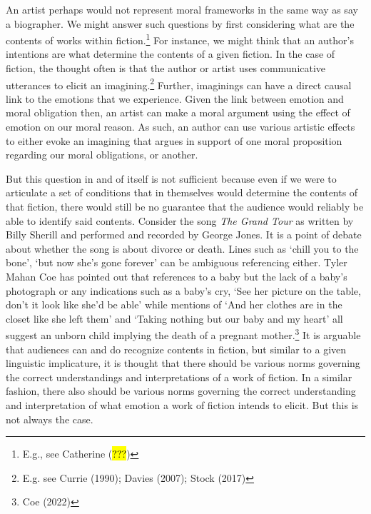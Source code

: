 \documentclass[
  letterpaper,
  DIV=11,
  numbers=noendperiod]{scrartcl}
\theoremstyle{remark}
\begin{document}
An artist perhaps would not represent moral frameworks in the same way
as say a biographer. We might answer such questions by first considering
what are the contents of works within fiction.\footnote{E.g., see
  Catherine (\hl{???})} For instance, we might think that an author's
intentions are what determine the contents of a given fiction. In the
case of fiction, the thought often is that the author or artist uses
communicative utterances to elicit an imagining.\footnote{E.g. see
  Currie (1990); Davies (2007); Stock (2017)} Further, imaginings can
have a direct causal link to the emotions that we experience. Given the
link between emotion and moral obligation then, an artist can make a
moral argument using the effect of emotion on our moral reason. As such,
an author can use various artistic effects to either evoke an imagining
that argues in support of one moral proposition regarding our moral
obligations, or another.

But this question in and of itself is not sufficient because even if we
were to articulate a set of conditions that in themselves would
determine the contents of that fiction, there would still be no
guarantee that the audience would reliably be able to identify said
contents. Consider the song \emph{The Grand Tour} as written by Billy
Sherill and performed and recorded by George Jones. It is a point of
debate about whether the song is about divorce or death. Lines such as
`chill you to the bone', `but now she's gone forever' can be ambiguous
referencing either. Tyler Mahan Coe has pointed out that references to a
baby but the lack of a baby's photograph or any indications such as a
baby's cry, `See her picture on the table, don't it look like she'd be
able' while mentions of `And her clothes are in the closet like she left
them' and `Taking nothing but our baby and my heart' all suggest an
unborn child implying the death of a pregnant mother.\footnote{Coe
  (2022)} It is arguable that audiences can and do recognize contents in
fiction, but similar to a given linguistic implicature, it is thought
that there should be various norms governing the correct understandings
and interpretations of a work of fiction. In a similar fashion, there
also should be various norms governing the correct understanding and
interpretation of what emotion a work of fiction intends to elicit. But
this is not always the case.
\end{document}
